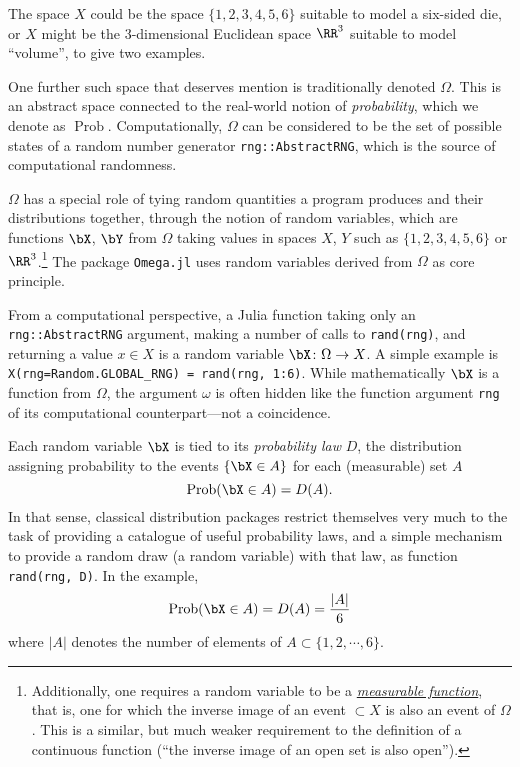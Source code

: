 \documentclass{juliacon}
\begin{document}
The space $X$ could be the space $\{1,2,3,4,5,6\}$ suitable to model a six-sided die, or $X$ might be the 3-dimensional Euclidean space $\RR^3$ suitable to model ``volume'', to give two examples.

One further such space that deserves mention is traditionally denoted $\Omega$. This is an abstract space connected to the real-world notion of \emph{probability}, which we denote as $\operatorname{Prob}$.
Computationally, $\Omega$ can be considered to be the set of possible states of a random number generator \verb|rng::AbstractRNG|, which is the source of computational randomness.

$\Omega$ has a special role of tying random quantities a program produces and their
distributions together, through the notion of random variables, which are
functions $\bX$, $\bY$ from $\Omega$ taking values in spaces $X$, $Y$ such as
$\{1,2,3,4,5,6\}$ or $\RR^3$.\footnote{Additionally, one requires a random
variable to be a \href{https://en.wikipedia.org/wiki/Measurable_function}{\emph{measurable
function}}, that is, one for which the inverse image of an event $\subset X$ is
also an event of $\Omega$.
This is a similar, but much weaker requirement to the definition of a continuous function (``the inverse image of an open set is also open'').}
The package \verb|Omega.jl| \cite{tavares2019language} uses random variables
derived from $\Omega$ as  core principle. 

From a computational perspective,
a Julia function taking only an \verb|rng::AbstractRNG| argument, making a number of calls to \verb|rand(rng)|, and returning a value $x\in X$ is a random variable $\bX \colon \Omega\to X$.
A simple example is  \verb|X(rng=Random.GLOBAL_RNG) = rand(rng, 1:6)|.
While mathematically $\bX$ is a function from $\Omega$, the argument $\omega$ is often hidden like the function argument \verb|rng| of its computational counterpart---not a coincidence.


Each random variable $\bX$ is tied to its \emph{probability law} $D$, the distribution assigning probability to the events $\{\bX \in A\}$ for each (measurable) set $A$
\[\operatorname{Prob}(\bX \in A) = D(A).
\]
In that sense, classical distribution packages restrict themselves very much to the task of providing a catalogue of useful probability laws, and a simple mechanism to provide a random draw (a random variable) with that law, as function
\verb|rand(rng, D)|.
In the example, 
\[\operatorname{Prob}(\bX \in A) = D(A) =  \dfrac{|A|}{6}\]
where $|A|$ denotes the number of elements of $A \subset \{1,2,\cdots,6\}$.
\end{document}
